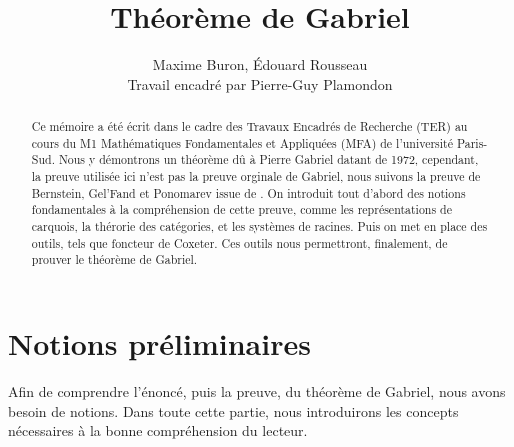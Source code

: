 \documentclass[a4paper,10pt]{article}
\title{Théorème de Gabriel}
\author{Maxime Buron, Édouard Rousseau\\
Travail encadré par Pierre-Guy Plamondon}
\begin{document}
\maketitle

\begin{abstract} 
	Ce mémoire a été écrit dans le cadre des Travaux Encadrés de Recherche (TER) au cours du M1 Mathématiques Fondamentales et Appliquées (MFA) de l'université Paris-Sud. Nous y démontrons un théorème dû à Pierre Gabriel datant de 1972, cependant, la preuve utilisée ici n'est pas la preuve orginale de Gabriel, nous suivons la preuve de Bernstein, Gel'Fand et Ponomarev issue de \cite{BGP72}. On introduit tout d'abord des notions fondamentales à la compréhension de cette preuve, comme les représentations de carquois, la thérorie des catégories, et les systèmes de racines. Puis on met en place des outils, tels que foncteur de Coxeter. Ces outils nous permettront, finalement, de prouver le théorème de Gabriel.
\end{abstract}

\tableofcontents

\clearpage
        
\section{Notions préliminaires}
Afin de comprendre l'énoncé, puis la preuve, du théorème de Gabriel, nous avons besoin de notions. Dans toute cette partie, nous introduirons les concepts nécessaires à la bonne compréhension du lecteur.
\end{document}
